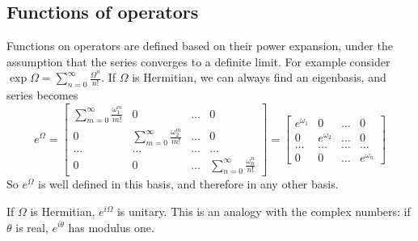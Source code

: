 \documentclass[11pt,fleqn]{book} %
\begin{document}
\subsection{Functions of operators}
Functions on operators are defined based on their power expansion, under the assumption that the series converges to a definite limit.
For example consider $\exp{\Omega} = \sum_{n=0}^{\infty}\frac{\Omega^n}{n!}$. If $\Omega$ is Hermitian, we can always find an eigenbasis, and series becomes
\begin{equation*}
    e^\Omega=\left[
        \begin{array}{cccc}
            \sum_{m=0}^{\infty}\frac{\omega_1^m}{m!} &0 &\dots &0 \\
            0 &\sum_{m=0}^{\infty}\frac{\omega_2^m}{m!} &\dots &0 \\
            \dots &\dots &\dots &\dots \\
            0 &0 &\dots &\sum_{n=0}^{\infty}\frac{\omega_n^n}{n!}
        \end{array}
    \right] = 
    \left[
        \begin{array}{cccc}
            e^{\omega_1} &0 &\dots &0 \\
            0 &e^{\omega_2} &\dots &0 \\
            \dots &\dots &\dots &\dots \\
            0 &0 &\dots &e^{\omega_n}
        \end{array}
    \right]
\end{equation*}
So $e^\Omega$ is well defined in this basis, and therefore in any other basis.
\begin{remark}
    If $\Omega$ is Hermitian, $e^{i\Omega}$ is unitary. This is an analogy with the
    complex numbers: if $\theta$ is real, $e^{i\theta}$ has modulus one. 
\end{remark}
\end{document}
